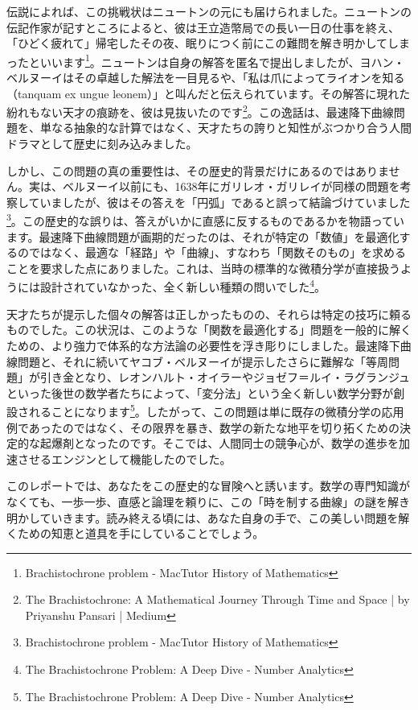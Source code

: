 \documentclass[a4paper,12pt]{bxjsarticle}
\begin{document}
伝説によれば、この挑戦状はニュートンの元にも届けられました。ニュートンの伝記作家が記すところによると、彼は王立造幣局での長い一日の仕事を終え、「ひどく疲れて」帰宅したその夜、眠りにつく前にこの難問を解き明かしてしまったといいます\footnote{Brachistochrone problem - MacTutor History of Mathematics}。ニュートンは自身の解答を匿名で提出しましたが、ヨハン・ベルヌーイはその卓越した解法を一目見るや、「私は爪によってライオンを知る（tanquam ex ungue leonem）」と叫んだと伝えられています。その解答に現れた紛れもない天才の痕跡を、彼は見抜いたのです\footnote{The Brachistochrone: A Mathematical Journey Through Time and Space | by Priyanshu Pansari | Medium}。この逸話は、最速降下曲線問題を、単なる抽象的な計算ではなく、天才たちの誇りと知性がぶつかり合う人間ドラマとして歴史に刻み込みました。

しかし、この問題の真の重要性は、その歴史的背景だけにあるのではありません。実は、ベルヌーイ以前にも、1638年にガリレオ・ガリレイが同様の問題を考察していましたが、彼はその答えを「円弧」であると誤って結論づけていました\footnote{Brachistochrone problem - MacTutor History of Mathematics}。この歴史的な誤りは、答えがいかに直感に反するものであるかを物語っています。最速降下曲線問題が画期的だったのは、それが特定の「数値」を最適化するのではなく、最適な「経路」や「曲線」、すなわち「関数そのもの」を求めることを要求した点にありました。これは、当時の標準的な微積分学が直接扱うようには設計されていなかった、全く新しい種類の問いでした\footnote{The Brachistochrone Problem: A Deep Dive - Number Analytics}。

天才たちが提示した個々の解答は正しかったものの、それらは特定の技巧に頼るものでした。この状況は、このような「関数を最適化する」問題を一般的に解くための、より強力で体系的な方法論の必要性を浮き彫りにしました。最速降下曲線問題と、それに続いてヤコブ・ベルヌーイが提示したさらに難解な「等周問題」が引き金となり、レオンハルト・オイラーやジョゼフ＝ルイ・ラグランジュといった後世の数学者たちによって、「変分法」という全く新しい数学分野が創設されることになります\footnote{The Brachistochrone Problem: A Deep Dive - Number Analytics}。したがって、この問題は単に既存の微積分学の応用例であったのではなく、その限界を暴き、数学の新たな地平を切り拓くための決定的な起爆剤となったのです。そこでは、人間同士の競争心が、数学の進歩を加速させるエンジンとして機能したのでした。

このレポートでは、あなたをこの歴史的な冒険へと誘います。数学の専門知識がなくても、一歩一歩、直感と論理を頼りに、この「時を制する曲線」の謎を解き明かしていきます。読み終える頃には、あなた自身の手で、この美しい問題を解くための知恵と道具を手にしていることでしょう。
\end{document}
